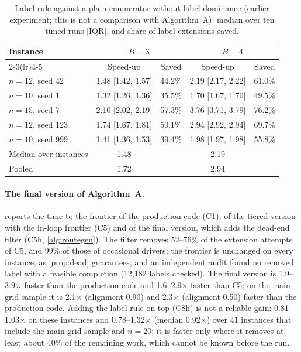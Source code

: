 \documentclass[11pt]{article}
\theoremstyle{definition}
\theoremstyle{remark}
\begin{document}
\begin{table}[!htbp]
\centering
\caption{Label rule against a plain enumerator without label dominance (earlier experiment; this is not a comparison with Algorithm~A): median over ten timed runs [IQR], and share of label extensions saved.}
\label{tab:label}
\small
\begin{tabular}{lcccc}
\toprule
Instance & \multicolumn{2}{c}{$B=3$} & \multicolumn{2}{c}{$B=4$}\\
\cmidrule(lr){2-3}\cmidrule(lr){4-5}
& Speed-up & Saved & Speed-up & Saved\\
\midrule
$n=12$, seed 42  & 1.48 [1.42, 1.57] & 44.2\% & 2.19 [2.17, 2.22] & 61.0\%\\
$n=10$, seed 1   & 1.32 [1.26, 1.36] & 35.5\% & 1.70 [1.67, 1.70] & 49.5\%\\
$n=15$, seed 7   & 2.10 [2.02, 2.19] & 57.3\% & 3.76 [3.71, 3.79] & 76.2\%\\
$n=12$, seed 123 & 1.74 [1.67, 1.81] & 50.1\% & 2.94 [2.92, 2.94] & 69.7\%\\
$n=10$, seed 999 & 1.41 [1.36, 1.53] & 39.4\% & 1.98 [1.97, 1.98] & 55.8\%\\
\midrule
Median over instances & 1.48 & & 2.19 & \\
Pooled                & 1.72 & & 2.94 & \\
\bottomrule
\end{tabular}
\end{table}

\paragraph{The final version of Algorithm~A.}  reports the time
to the frontier of the production code (C1), of the tiered version with the
in-loop frontier (C5) and of the final version, which adds the dead-end filter
(C5h, \cref{alg:routegen}). The filter removes 52--76\% of the extension
attempts of C5, and 99\% of those of occasional drivers; the frontier is
unchanged on every instance, as \cref{prop:dead} guarantees, and an
independent audit found no removed label with a feasible completion (12,182
labels checked). The final version is 1.9--3.9$\times$ faster than the
production code and 1.6--2.9$\times$ faster than C5; on the main-grid sample
it is 2.1$\times$ (alignment 0.90) and 2.3$\times$ (alignment 0.50) faster than
the production code. Adding the label rule on top (C8h) is not a reliable gain:
0.81--1.03$\times$ on these instances and 0.78--1.32$\times$ (median
0.92$\times$) over 41 instances that include the main-grid sample and $n=20$;
it is faster only where it removes at least about 40\% of the remaining work,
which cannot be known before the run.
\end{document}
